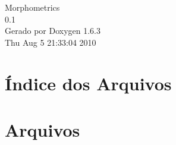 \documentclass[a4paper]{book}
\begin{document}
\hypersetup{pageanchor=false}
\begin{titlepage}
\vspace*{7cm}
\begin{center}
{\Large Morphometrics \\[1ex]\large 0.1 }\\
\vspace*{1cm}
{\large Gerado por Doxygen 1.6.3}\\
\vspace*{0.5cm}
{\small Thu Aug 5 21:33:04 2010}\\
\end{center}
\end{titlepage}
\clearemptydoublepage
{}
\tableofcontents
\clearemptydoublepage
{}
\hypersetup{pageanchor=true}
\chapter{Índice dos Arquivos}

\chapter{Arquivos}












\printindex
\end{document}

